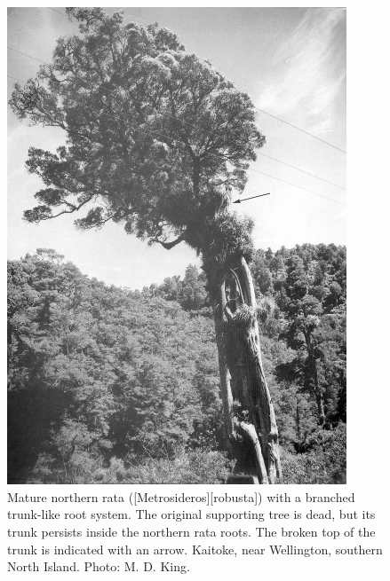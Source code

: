 \begin{figure}[htb]
	\centering
	\begin{minipage}[t]{0.525\textwidth}
		\centering
		\includegraphics[width=0.9\textwidth]{graphics/figure52rata-branched.jpg}
    	\caption[Mature northern rata with a branched trunk-like root system]{Mature northern rata ([Metrosideros][robusta]) with a branched trunk-like root system.
        The original supporting tree is dead, but its trunk persists inside the northern rata roots.
        The broken top of the trunk is indicated with an arrow.
        Kaitoke, near Wellington, southern North Island.
    	Photo: M. D. King.}%
    	\label{fig:52rata-branched}
	\end{minipage}\hfill%
	\begin{minipage}[t]{0.455\textwidth}
    	\centering

\end{minipage}
\end{figure}

